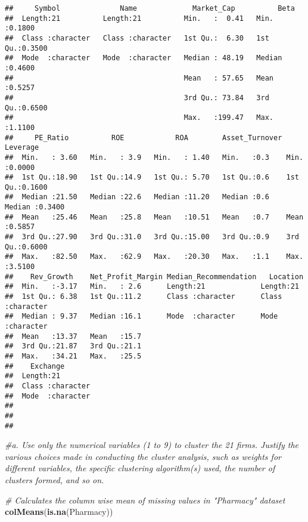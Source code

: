 \documentclass[
]{article}
\newenvironment{Shaded}{\begin{snugshade}}{\end{snugshade}}
\newcommand{\CommentTok}[1]{\textcolor[rgb]{0.56,0.35,0.01}{\textit{#1}}}
\newcommand{\FunctionTok}[1]{\textcolor[rgb]{0.13,0.29,0.53}{\textbf{#1}}}
\newcommand{\NormalTok}[1]{#1}
\begin{document}
\begin{verbatim}
##     Symbol              Name             Market_Cap          Beta       
##  Length:21          Length:21          Min.   :  0.41   Min.   :0.1800  
##  Class :character   Class :character   1st Qu.:  6.30   1st Qu.:0.3500  
##  Mode  :character   Mode  :character   Median : 48.19   Median :0.4600  
##                                        Mean   : 57.65   Mean   :0.5257  
##                                        3rd Qu.: 73.84   3rd Qu.:0.6500  
##                                        Max.   :199.47   Max.   :1.1100  
##     PE_Ratio          ROE            ROA        Asset_Turnover    Leverage     
##  Min.   : 3.60   Min.   : 3.9   Min.   : 1.40   Min.   :0.3    Min.   :0.0000  
##  1st Qu.:18.90   1st Qu.:14.9   1st Qu.: 5.70   1st Qu.:0.6    1st Qu.:0.1600  
##  Median :21.50   Median :22.6   Median :11.20   Median :0.6    Median :0.3400  
##  Mean   :25.46   Mean   :25.8   Mean   :10.51   Mean   :0.7    Mean   :0.5857  
##  3rd Qu.:27.90   3rd Qu.:31.0   3rd Qu.:15.00   3rd Qu.:0.9    3rd Qu.:0.6000  
##  Max.   :82.50   Max.   :62.9   Max.   :20.30   Max.   :1.1    Max.   :3.5100  
##    Rev_Growth    Net_Profit_Margin Median_Recommendation   Location        
##  Min.   :-3.17   Min.   : 2.6      Length:21             Length:21         
##  1st Qu.: 6.38   1st Qu.:11.2      Class :character      Class :character  
##  Median : 9.37   Median :16.1      Mode  :character      Mode  :character  
##  Mean   :13.37   Mean   :15.7                                              
##  3rd Qu.:21.87   3rd Qu.:21.1                                              
##  Max.   :34.21   Max.   :25.5                                              
##    Exchange        
##  Length:21         
##  Class :character  
##  Mode  :character  
##                    
##                    
## 
\end{verbatim}

\begin{Shaded}
\begin{Highlighting}[]
\CommentTok{\#a. Use only the numerical variables (1 to 9) to cluster the 21 firms. Justify the various choices made in conducting the cluster analysis, such as weights for different variables, the specific clustering algorithm(s) used, the number of clusters formed, and so on.}

\CommentTok{\# Calculates the column wise mean of missing values in "Pharmacy" dataset}
\FunctionTok{colMeans}\NormalTok{(}\FunctionTok{is.na}\NormalTok{(Pharmacy))}
\end{Highlighting}
\end{Shaded}
\end{document}
